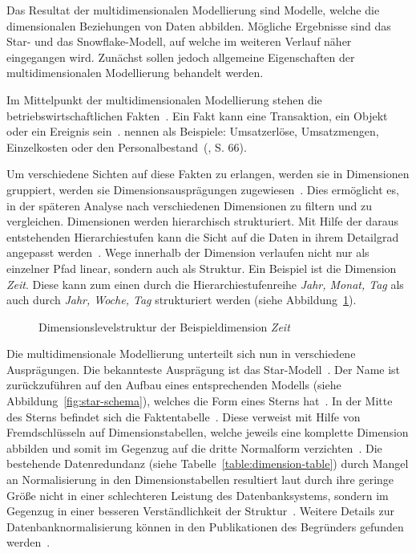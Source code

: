 \documentclass[
  language=german, %
  type=bachelor,%
  ngerman
]{isthesis}
\begin{document}
\begin{content}
  Das Resultat der multidimensionalen Modellierung sind Modelle, welche die
  dimensionalen Beziehungen von Daten abbilden. Mögliche Ergebnisse sind das
  Star- und das Snowflake-Modell, auf welche im weiteren Verlauf näher
  eingegangen wird. Zunächst sollen jedoch allgemeine Eigenschaften der
  multidimensionalen Modellierung behandelt werden.

  Im Mittelpunkt der multidimensionalen Modellierung stehen die
  betriebswirtschaftlichen Fakten~\cite[][S.  2]{phipps2002automating}. Ein
  Fakt kann eine Transaktion, ein Objekt oder ein Ereignis sein~\cite[][S.
  42]{ballard1998data}. \textsc{\citeauthor{Kemper2010}} nennen als Beispiele:
  \glqq{}Umsatzerlöse, Umsatzmengen, Einzelkosten oder den
  Personalbestand\grqq{}~(\citeyear{Kemper2010}, S. 66). 

  Um verschiedene Sichten auf diese Fakten zu erlangen, werden sie in Dimensionen gruppiert, \bzw{} werden sie Dimensionsausprägungen zugewiesen~\cite[][S.
  66]{Kemper2010}. Dies ermöglicht es, in der späteren Analyse nach
  verschiedenen Dimensionen zu filtern und zu vergleichen. Dimensionen werden
  hierarchisch strukturiert. Mit Hilfe der daraus entstehenden Hierarchiestufen
  kann die Sicht auf die Daten in ihrem Detailgrad angepasst werden~\cite[][S.
  66]{Kemper2010}. Wege innerhalb der Dimension verlaufen nicht nur als
  einzelner Pfad linear, sondern auch als Struktur. Ein Beispiel ist die
  Dimension \textit{Zeit}.  Diese kann zum einen durch die
  Hierarchiestufenreihe \textit{Jahr, Monat, Tag} als auch durch \textit{Jahr,
  Woche, Tag} strukturiert werden (siehe
  Abbildung~\ref{hierarchie-level-struktur}).

  \begin{figure}
    \resizebox{100pt}{!}{}
    \caption{Dimensionslevelstruktur der Beispieldimension \textit{Zeit}}\label{hierarchie-level-struktur}
  \end{figure}

  Die multidimensionale Modellierung unterteilt sich nun in verschiedene
  Ausprägungen.  Die bekannteste Ausprägung ist das Star-Modell~\cite[][S.
  2]{phipps2002automating}. Der Name ist zurückzuführen auf den Aufbau eines
  entsprechenden Modells (siehe Abbildung~\ref{fig:star-schema}), welches die
  Form eines Sterns hat~\cite[][S.  44]{Kimball2013}. In der Mitte des Sterns
  befindet sich die Faktentabelle~\cite[][S. 67]{Kemper2010}. Diese verweist
  mit Hilfe von Fremdschlüsseln auf Dimensionstabellen, welche jeweils eine
  komplette Dimension abbilden und somit im Gegenzug auf die dritte Normalform
  verzichten~\cite[][S. 67 f.]{Kemper2010}. Die bestehende Datenredundanz
  (siehe Tabelle~\ref{table:dimension-table}) durch Mangel an Normalisierung
  in den Dimensionstabellen resultiert laut \textsc{\citeauthor{Kimball2013}}
  durch ihre geringe Größe nicht in einer schlechteren Leistung des
  Datenbanksystems, sondern im Gegenzug in einer besseren Verständlichkeit der
  Struktur~\cite[][S. 15]{Kimball2013}. Weitere Details zur
  Datenbanknormalisierung können in den Publikationen des Begründers
  \textsc{\citeauthor{codd1970relational}} gefunden
  werden~\citeyearpar{codd1970relational,codd1972further}.


\end{content}
\end{document}
